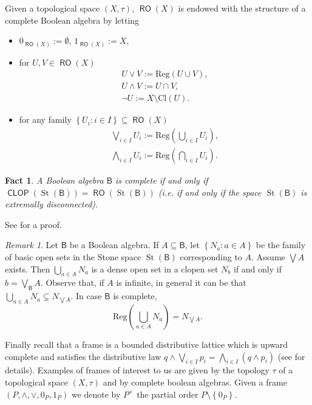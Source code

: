 \documentclass[11pt]{amsart}
\theoremstyle{plain}
\newtheorem{fact}[theorem]{Fact}
\theoremstyle{definition}
\theoremstyle{plain}
\theoremstyle{remark}
\newtheorem{remark}[theorem]{Remark}
\DeclareMathOperator{\St}{St}
\DeclareMathOperator{\RO}{\mathsf{RO}}
\DeclareMathOperator{\CLOP}{\mathsf{CLOP}}
\newcommand{\bool}[1]{\mathsf{#1}}
\newcommand{\Cl}[1]{\mathrm{Cl}\left(#1\right)}
\newcommand{\Reg}[1]{\mathrm{Reg}\left(#1\right)}
\newcommand{\bp}[1]{\left\lbrace #1 \right\rbrace}
\newcommand{\0}{\mathsf{0}}
\renewcommand{\1}{\mathsf{1}}
\renewcommand{\2}{\mathsf{2}}
\theoremstyle{definition}
\begin{document}
Given a topological space $(X,\tau)$,
$\RO(X)$ is endowed with the structure of a complete Boolean algebra by letting
\begin{itemize}
\item
$0_{\RO(X)}:=\emptyset$, $1_{\RO(X)}:=X$,
\item 
 for $U, V\in\RO(X)$
\begin{gather*}
U\vee V:=\Reg{U\cup V}, \\
U\wedge V:=U\cap V, \\
\neg U:=X\setminus\Cl{U}.
\end{gather*}
\item
for any family $\bp{U_i: i\in I}\subseteq\RO(X)$
\begin{gather*}
\bigvee_{i\in I}U_i:=\Reg{\bigcup_{i\in I}U_i}, \\
\bigwedge_{i\in I}U_i:=\Reg{\bigcap_{i\in I}U_i}.
\end{gather*}
\end{itemize}
\begin{fact}
\label{comp:bool}
A Boolean algebra $\bool{B}$ is complete if and only if $\CLOP(\St(\bool{B}))=\RO(\St(\bool{B}))$ (i.e. if and only if the space $\St(\bool{B})$ is extremally disconnected).
\end{fact}
See \cite[Prop. 4.1.5]{viale-bookonforcing} for a proof.
\begin{remark}
\label{rem:supisdense}
Let $\bool{B}$ be a Boolean algebra. If $A\subseteq\bool{B}$, let $\bp{N_a: a\in A}$ be the family of basic open sets in the Stone space $\St(\bool{B})$ corresponding to $A$. Assume $\bigvee A$ exists. Then $\bigcup_{a\in A}N_a$ is a dense open set in a clopen set $N_b$ if and only if $b=\bigvee_{\bool{B}} A$. Observe that, if $A$ is infinite, in general it can be that $\bigcup_{a\in A}N_a\subsetneq N_{\bigvee A}$.
In case $\bool{B}$ is complete, 
\[\Reg{\bigcup_{a\in A}N_a}=N_{\bigvee A}.\]
\end{remark}

Finally recall that a frame is a bounded distributive lattice which is upward complete and satisfies the distributive law $q\wedge\bigvee_{i\in I}p_i=\bigwedge_{i\in I}(q \wedge p_i)$
(see \cite[Chapter IX]{MacLMoer} for details). Examples of frames of interest to us are given by the topology $\tau$ of a topological space $(X,\tau)$ and by complete boolean algebras. Given a frame 
$(P,\wedge,\vee,0_P,1_P)$ we denote by $P^+$ the partial order $P\setminus \bp{0_P}$.
\end{document}
